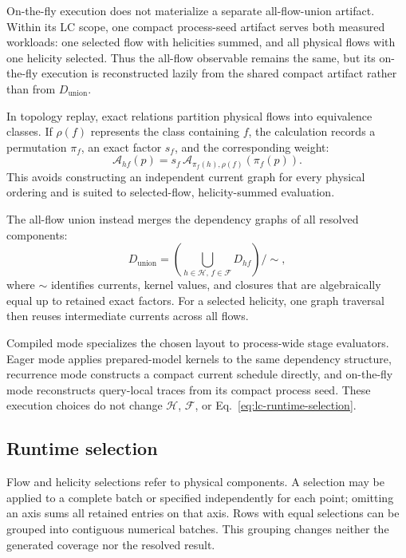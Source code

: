 On-the-fly execution does not materialize a separate all-flow-union artifact.
Within its LC scope, one compact process-seed artifact serves both measured
workloads: one selected flow with helicities summed, and all physical flows
with one helicity selected. Thus the all-flow observable remains the same, but
its on-the-fly execution is reconstructed lazily from the shared compact
artifact rather than from \(D_{\mathrm{union}}\).

In topology replay, exact relations partition physical flows into equivalence
classes. If \(\rho(f)\) represents the class containing \(f\), the calculation
records a permutation \(\pi_f\), an exact factor \(s_f\), and the corresponding
weight:
\begin{equation}
  \mathcal A_{h f}(p)
  =s_f\,\mathcal A_{\pi_f(h),\rho(f)}\!\left(\pi_f(p)\right).
  \label{eq:lc-topology-replay}
\end{equation}
This avoids constructing an independent current graph for every physical
ordering and is suited to selected-flow, helicity-summed evaluation.

The all-flow union instead merges the dependency graphs of all resolved
components:
\begin{equation}
  D_{\mathrm{union}}
  =\left(\bigcup_{h\in\mathcal H,\,f\in\mathcal F}D_{hf}\right)
   \big/\!\sim ,
  \label{eq:lc-all-flow-union}
\end{equation}
where \(\sim\) identifies currents, kernel values, and closures that are
algebraically equal up to retained exact factors.  For a selected helicity,
one graph traversal then reuses intermediate currents across all flows.

Compiled mode specializes the chosen layout to process-wide stage evaluators.
Eager mode applies prepared-model kernels to the same dependency structure,
recurrence mode constructs a compact current schedule directly, and on-the-fly
mode reconstructs query-local traces from its compact process seed. These
execution choices do not change \(\mathcal H\), \(\mathcal F\), or
Eq.~\eqref{eq:lc-runtime-selection}.

\subsection{Runtime selection}

Flow and helicity selections refer to physical components.  A selection may be
applied to a complete batch or specified independently for each point; omitting
an axis sums all retained entries on that axis.  Rows with equal selections can
be grouped into contiguous numerical batches.  This grouping changes neither
the generated coverage nor the resolved result.

